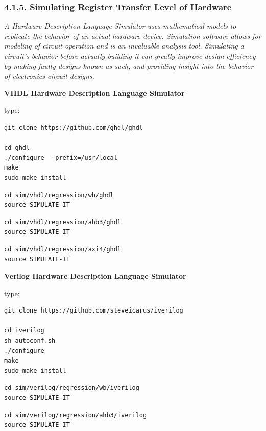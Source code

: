 \documentclass[
]{article}
\begin{document}
\hypertarget{simulating-register-transfer-level-of-hardware}{%
\subsubsection{4.1.5. Simulating Register Transfer Level of
Hardware}\label{simulating-register-transfer-level-of-hardware}}

\emph{A Hardware Description Language Simulator uses mathematical models
to replicate the behavior of an actual hardware device. Simulation
software allows for modeling of circuit operation and is an invaluable
analysis tool. Simulating a circuit's behavior before actually building
it can greatly improve design efficiency by making faulty designs known
as such, and providing insight into the behavior of electronics circuit
designs.}

\textbf{VHDL Hardware Description Language Simulator}

type:

\begin{verbatim}
git clone https://github.com/ghdl/ghdl

cd ghdl
./configure --prefix=/usr/local
make
sudo make install
\end{verbatim}

\begin{verbatim}
cd sim/vhdl/regression/wb/ghdl
source SIMULATE-IT
\end{verbatim}

\begin{verbatim}
cd sim/vhdl/regression/ahb3/ghdl
source SIMULATE-IT
\end{verbatim}

\begin{verbatim}
cd sim/vhdl/regression/axi4/ghdl
source SIMULATE-IT
\end{verbatim}

\textbf{Verilog Hardware Description Language Simulator}

type:

\begin{verbatim}
git clone https://github.com/steveicarus/iverilog

cd iverilog
sh autoconf.sh
./configure
make
sudo make install
\end{verbatim}

\begin{verbatim}
cd sim/verilog/regression/wb/iverilog
source SIMULATE-IT
\end{verbatim}

\begin{verbatim}
cd sim/verilog/regression/ahb3/iverilog
source SIMULATE-IT
\end{verbatim}
\end{document}
